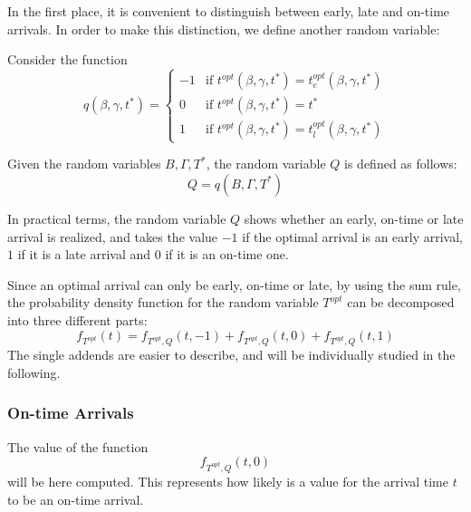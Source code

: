In the first place,
 it is convenient to distinguish between early, late and on-time arrivals.
In order to make this distinction, we define another random variable:
\begin{definition}
  Consider the function
  \begin{equation*}
    q(\beta, \gamma, t^*) =
    \begin{cases}
      -1 & \text{if } t^{opt}(\beta, \gamma, t^*) = t_e^{opt}(\beta, \gamma, t^*) \\
      0 & \text{if } t^{opt}(\beta, \gamma, t^*) = t^* \\
      1 & \text{if } t^{opt}(\beta, \gamma, t^*) = t_l^{opt}(\beta, \gamma, t^*)
    \end{cases}
  \end{equation*}

  Given the random variables \(B, \Gamma, T^*\), the random variable \(Q\) is defined as follows:
  \begin{equation*}
    Q  = q(B, \Gamma, T^*)
  \end{equation*}
\end{definition}

In practical terms, the random variable \(Q\) shows whether an early, on-time or late arrival is realized,
and takes the value \(-1\) if the optimal arrival is an early arrival,
\(1\) if it is a late arrival and \(0\) if it is an on-time one.

Since an optimal arrival can only be early, on-time or late,
by using the sum rule,
the probability density function for the random variable \(T^{opt}\) can be decomposed into three different parts:
\begin{equation}
  \label{eq:pdf-decomposed-q}
  f_{T^{opt}}(t) = f_{T^{opt}, Q}(t, -1) + f_{T^{opt}, Q}(t, 0) + f_{T^{opt}, Q}(t, 1)
\end{equation}
The single addends are easier to describe,
and will be individually studied in the following.

\subsubsection{On-time Arrivals}

The value of the function
\begin{equation*}
  f_{T^{opt}, Q}(t, 0)
\end{equation*}
will be here computed.
This represents how likely is a value for the arrival time \(t\) to be an on-time arrival.

